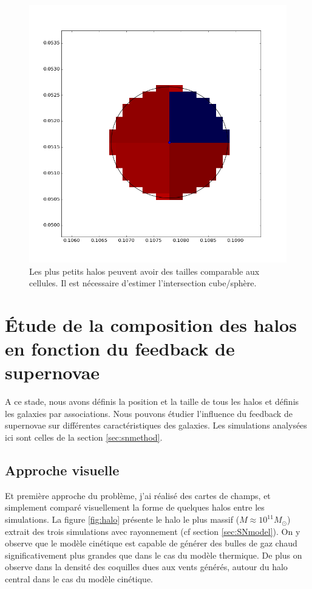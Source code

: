 \begin{figure}
	\centering
	\includegraphics[width=.4\linewidth]{img/03/intersec.png}
    \caption[Projection des petits halo]{Les plus petits halos peuvent avoir des tailles comparable aux cellules.
    Il est nécessaire d’estimer l'intersection cube/sphère.
 	\label{fig:intersec}}
\end{figure}

\clearpage
\section{Étude de la composition des halos en fonction du feedback de supernovae}

A ce stade, nous avons définis la position et la taille de tous les halos et définis les galaxies par associations.
Nous pouvons étudier l'influence du feedback de supernovae sur différentes caractéristiques des galaxies.
Les simulations analysées ici sont celles de la section \ref{sec:snmethod}.

\subsection{Approche visuelle}
\label{sec:snmaps}

Et première approche du problème, j'ai réalisé des cartes de champs, et simplement comparé visuellement la forme de quelques halos entre les simulations.
La figure \ref{fig:halo} présente le halo le plus massif ($M\approx10^{11} M_\odot$) extrait des trois simulations avec rayonnement (cf section \ref{sec:SNmodel}).
On y observe que le modèle cinétique est capable de générer des bulles de gaz chaud significativement plus grandes que dans le cas du modèle thermique.
De plus on observe dans la densité des coquilles dues aux vents générés, autour du halo central dans le cas du modèle cinétique.

